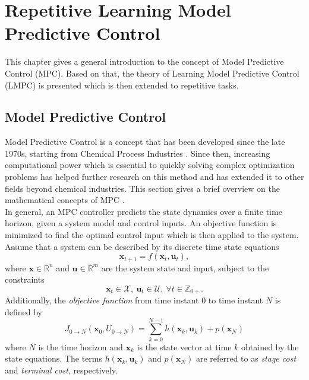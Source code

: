 \chapter{Repetitive Learning Model Predictive Control}
This chapter gives a general introduction to the concept of Model Predictive Control (MPC). Based on that, the theory of Learning Model Predictive Control (LMPC) is presented which is then extended to repetitive tasks. %

\section{Model Predictive Control}
Model Predictive Control is a concept that has been developed since the late 1970s, starting from Chemical Process Industries \cite{garcia1989model}. Since then, increasing computational power which is essential to quickly solving complex optimization problems has helped further research on this method and has extended it to other fields beyond chemical industries.
This section gives a brief overview on the mathematical concepts of MPC \cite{Borrelli2003}.\\
In general, an MPC controller predicts the state dynamics over a finite time horizon, given a system model and control inputs. An objective function is minimized to find the optimal control input which is then applied to the system.\\
Assume that a system can be described by its discrete time state equations
\begin{equation}
\bm{x}_{t+1}=f(\bm{x}_t,\bm{u}_t),
\end{equation}
where $\bm{x}\in \mathbb{R}^n$ and $\bm{u}\in\mathbb{R}^m$ are the system state and input, subject to the constraints
\begin{equation}
\bm{x}_t\in\mathcal{X},\ \bm{u}_t\in\mathcal{U},\ \forall t\in\mathbb{Z}_{0+}.
\end{equation}
Additionally, the \emph{objective function} from time instant $0$ to time instant $N$ is defined by
\begin{equation}
J_{0\rightarrow N}(\bm{x}_0,U_{0\rightarrow N})=\sum_{k=0}^{N-1}h(\bm{x}_k,\bm{u}_k) + p(\bm{x}_N)
\end{equation}
where $N$ is the time horizon and $\bm{x}_k$ is the state vector at time $k$ obtained by the state equations. The terms $h(\bm{x}_k,\bm{u}_k)$ and $p(\bm{x}_N)$ are referred to as \emph{stage cost} and \emph{terminal cost}, respectively. 
